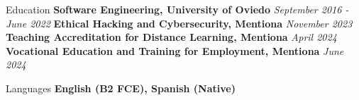 \documentclass{resume} %
\begin{document}

\pagestyle{fancy}

\def\headrulewidth{0pt}
\setlength{\ruleheight}{\textheight}
\addtolength{\ruleheight}{20mm}
\fancyhead{}
\fancyfoot{}
\fancyfoot[C]{\footnotesize\thepage}


\begin{rSection}{Education}
{\bf Software Engineering, University of Oviedo} {\em September 2016 - June 2022}\newline
{\bf Ethical Hacking and Cybersecurity, Mentiona} {\em November 2023} \newline
{\bf Teaching Accreditation for Distance Learning, Mentiona} {\em April 2024} \newline
{\bf Vocational Education and Training for Employment, Mentiona} {\em June 2024}
\end{rSection}


\begin{rSection}{Languages}
{\bf English (B2 FCE), Spanish (Native)}
\end{rSection}


\end{document}
